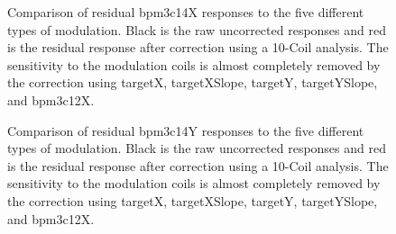 \begin{figure}

\centering
{}
\caption{Comparison of residual bpm3c14X responses to the five different types of modulation. Black is the raw uncorrected responses and red is the residual response after correction using a 10-Coil analysis. The sensitivity to the modulation coils is almost completely removed by the correction using targetX, targetXSlope, targetY, targetYSlope, and bpm3c12X.}
\label{fig:residual_bpm3c14X}
\end{figure}
\begin{figure}

\centering
{}
\caption{Comparison of residual bpm3c14Y responses to the five different types of modulation. Black is the raw uncorrected responses and red is the residual response after correction using a 10-Coil analysis. The sensitivity to the modulation coils is almost completely removed by the correction using targetX, targetXSlope, targetY, targetYSlope, and bpm3c12X.}
\label{fig:residual_bpm3c14Y}
\end{figure}

